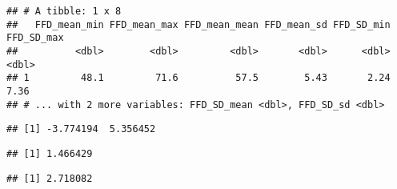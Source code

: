 \documentclass[
]{article}
\newenvironment{Shaded}{\begin{snugshade}}{\end{snugshade}}
\newcommand{\CommentTok}[1]{\textcolor[rgb]{0.56,0.35,0.01}{\textit{#1}}}
\newcommand{\DecValTok}[1]{\textcolor[rgb]{0.00,0.00,0.81}{#1}}
\newcommand{\KeywordTok}[1]{\textcolor[rgb]{0.13,0.29,0.53}{\textbf{#1}}}
\newcommand{\NormalTok}[1]{#1}
\newcommand{\OperatorTok}[1]{\textcolor[rgb]{0.81,0.36,0.00}{\textbf{#1}}}
\begin{document}
\begin{verbatim}
## # A tibble: 1 x 8
##   FFD_mean_min FFD_mean_max FFD_mean_mean FFD_mean_sd FFD_SD_min FFD_SD_max
##          <dbl>        <dbl>         <dbl>       <dbl>      <dbl>      <dbl>
## 1         48.1         71.6          57.5        5.43       2.24       7.36
## # ... with 2 more variables: FFD_SD_mean <dbl>, FFD_SD_sd <dbl>
\end{verbatim}

\begin{Shaded}
\end{Shaded}

\begin{verbatim}
## [1] -3.774194  5.356452
\end{verbatim}

\begin{Shaded}
\end{Shaded}

\begin{verbatim}
## [1] 1.466429
\end{verbatim}

\begin{Shaded}
\end{Shaded}

\begin{verbatim}
## [1] 2.718082
\end{verbatim}

\begin{Shaded}
\end{Shaded}
\end{document}
